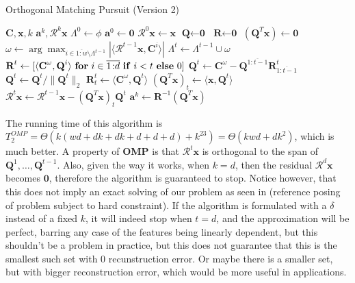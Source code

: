 \documentclass[12pt,a4paper,oneside,english]{UPBThesis}
\newcommand{\hcrange}[2]{\overline{{#1}\colon\!\!{#2}}}
\begin{document}
\begin{algorithm}
\caption{Orthogonal Matching Pursuit (Version 2)}
\label{algo:OrthogonalMatchingPursuitMethodV2}
\begin{algorithmic}
\Require $\textbf{C},\textbf{x},k$
\Ensure $\textbf{a}^k,\mathcal{R}^k\textbf{x}$
\State $\Lambda^0 \gets \phi$
\State $\textbf{a}^0 \gets \textbf{0}$
\State $\mathcal{R}^0\textbf{x} \gets \textbf{x}$
\State $\textbf{Q} \gets \textbf{0}$
\State $\textbf{R} \gets \textbf{0}$
\State $(\textbf{Q}^T\textbf{x}) \gets \textbf{0}$
\For {$t = \hcrange{1}{k}$}
\State $\omega \gets \arg \max_{i \in \hcrange{1}{w} \setminus \Lambda^{t-1}} \left| \langle \mathcal{R}^{t-1}\textbf{x} , \textbf{C}^i \rangle \right|$
\State $\Lambda^t \gets \Lambda^{t-1} \cup \omega$
\State $\textbf{R}^t \gets [ \langle \textbf{C}^\omega, \textbf{Q}^i \rangle~\mbox{\textbf{for} $i \in \hcrange{1}{d}$ \textbf{if} $i < t$ \textbf{else} $0$} ]$ 
\State $\textbf{Q}^t \gets \textbf{C}^\omega - \textbf{Q}^{\hcrange{1}{t-1}}\textbf{R}^t_{\hcrange{1}{t-1}}$ 
\State $\textbf{Q}^t \gets \textbf{Q}^t / \| \textbf{Q}^t \|_2$ 
\State $\textbf{R}^t_t \gets \langle \textbf{C}^\omega, \textbf{Q}^t \rangle$
\State $(\textbf{Q}^T\textbf{x})_t \gets \langle \textbf{x}, \textbf{Q}^t \rangle$
\State $\mathcal{R}^t\textbf{x} \gets \mathcal{R}^{t-1}\textbf{x} -  (\textbf{Q}^T\textbf{x})_t \textbf{Q}^t$
\EndFor
\State $\textbf{a}^k \gets \textbf{R}^{-1}(\textbf{Q}^T\textbf{x})$
\end{algorithmic}
\end{algorithm}

The running time of this algorithm is $T_2^{OMP} = \Theta(k(wd + dk + dk + d + d + d) + k^23) = \Theta(kwd + dk^2)$, which is much better. A property of \textbf{OMP} is that $\mathcal{R}^t\textbf{x}$ is orthogonal to the span of $\textbf{Q}^1,\dots,\textbf{Q}^{t-1}$. Also, given the way it works, when $k = d$, then the residual $\mathcal{R}^d\textbf{x}$ becomes $\textbf{0}$, therefore the algorithm is guaranteed to stop. Notice however, that this does not imply an exact solving of our problem as seen in (reference posing of problem subject to hard constraint). If the algorithm is formulated with a $\delta$ instead of a fixed $k$, it will indeed stop when $t = d$, and the approximation will be perfect, barring any case of the features being linearly dependent, but this shouldn't be a problem in practice, but this does not guarantee that this is the smallest such set with $0$ recunstruction error. Or maybe there is a smaller set, but with bigger reconstruction error, which would be more useful in applications.
\end{document}
